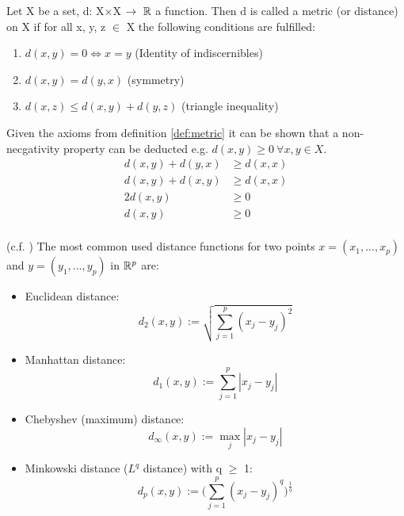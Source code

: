 \begin{definition}\label{def:metric} Let X be a set, d: X$\times$X $\rightarrow~\mathbb{R}$ a function. Then d is called a metric (or distance) on X if for all x, y, z $\in$ X the following conditions are fulfilled: 
\begin{enumerate}[label=(\subscript{D}{\arabic*})]
	\item\label{itm:namee} $d(x,y) = 0 \Leftrightarrow x = y$ \quad (Identity of indiscernibles)
	\item $d(x,y) = d(y,x)$ \quad (symmetry)
	\item $d(x,z) \leq d(x,y) + d(y,z)$ \quad (triangle inequality)
\end{enumerate}

\begin{remark}
	Given the axioms from definition \ref{def:metric} it can be shown that a non-necgativity property can be deducted e.g. $d(x,y) \geq 0 ~\forall x,y \in X$.
	\begin{equation*}
	\begin{split}
		d(x,y) + d(y,x) & \geq d(x,x) \\
		d(x,y) + d(x,y) & \geq d(x,x) \\
		2d(x,y)         & \geq 0      \\
		d(x,y)          & \geq 0      \\
	\end{split}
	\end{equation*}
\end{remark}


\begin{example}(c.f. \cite{analysis_1}) The most common used distance functions for two points $x=(x_1, ..., x_p)$ and  $y=(y_1, ..., y_p)$ in $\mathbb{R}^p$ are: 
	\begin{itemize}[label=$\star$]
		\item Euclidean distance:
			\begin{equation*}
				d_2(x,y) := \sqrt{\sum_{j=1}^p(x_j - y_j)^2}
			\end{equation*}
		\item Manhattan distance:
			\begin{equation*}
				d_1(x,y) := \sum_{j=1}^p|x_j - y_j|
			\end{equation*}
		\item Chebyshev (maximum) distance:
			\begin{equation*}
				d_\infty(x,y) := \max_j|x_j - y_j|
			\end{equation*}		
		\item Minkowski distance ($L^q$ distance) with q $\geq$ 1:
			\begin{equation*}
				d_p(x,y) := \bigg(\sum_{j=1}^p(x_j - y_j)^q\bigg)^{\frac{1}{q}}
			\end{equation*}	
	\end{itemize}
\end{example}

\end{definition}
